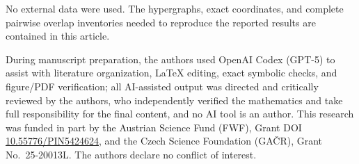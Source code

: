 \documentclass[twocolumn,aps,pra,floatfix,amsmath,amssymb,longbibliography]{revtex4-2}
\theoremstyle{definition}
\theoremstyle{remark}
\begin{document}
No external data were used.  The hypergraphs, exact coordinates, and complete
pairwise overlap inventories needed to reproduce the reported results are
contained in this article.

\begin{acknowledgments}
During manuscript preparation, the authors used OpenAI Codex (GPT-5) to assist with literature organization, LaTeX editing, exact symbolic checks, and figure/PDF verification; all AI-assisted output was directed and critically reviewed by the authors, who independently verified the mathematics and take full responsibility for the final content, and no AI tool is an author.
This research was funded in part by the Austrian
Science Fund (FWF), Grant DOI \href{https://doi.org/10.55776/PIN5424624}{10.55776/PIN5424624}, and the Czech Science
Foundation (GA\v{C}R), Grant No.~25-20013L.  The authors declare no
conflict of interest.
\end{acknowledgments}


\end{document}
